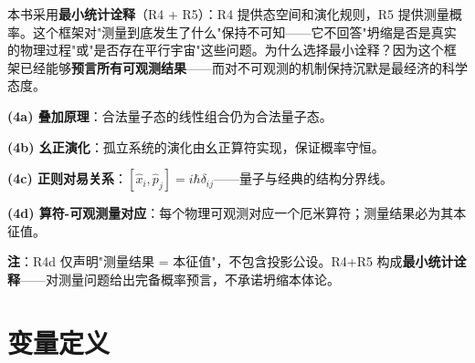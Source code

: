 本书采用\textbf{最小统计诠释}（R4 + R5）：R4 提供态空间和演化规则，R5 提供测量概率。这个框架对"测量到底发生了什么"保持不可知——它不回答"坍缩是否是真实的物理过程"或"是否存在平行宇宙"这些问题。为什么选择最小诠释？因为这个框架已经能够\textbf{预言所有可观测结果}——而对不可观测的机制保持沉默是最经济的科学态度。

\begin{principlebox}[R4 — 量子力学公设]
  \textbf{(4a) 叠加原理}：合法量子态的线性组合仍为合法量子态。

  \textbf{(4b) 幺正演化}：孤立系统的演化由幺正算符实现，保证概率守恒。

  \textbf{(4c) 正则对易关系}：$[\hat{x}_i, \hat{p}_j] = i\hbar\delta_{ij}$——量子与经典的结构分界线。

  \textbf{(4d) 算符-可观测量对应}：每个物理可观测对应一个厄米算符；测量结果必为其本征值。

  \textbf{注}：R4d 仅声明"测量结果 = 本征值"，不包含投影公设。R4+R5 构成\textbf{最小统计诠释}——对测量问题给出完备概率预言，不承诺坍缩本体论。
\end{principlebox}

\section{变量定义}

